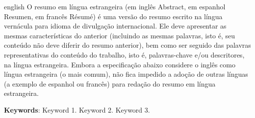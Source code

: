 \begin{resumo}[Abstract]
\begin{otherlanguage*}{english}
    O resumo em língua estrangeira (em inglês Abstract, em espanhol Resumen, em francês Résumé) é uma versão do resumo escrito na língua vernácula para idioma de divulgação internacional. Ele deve apresentar as mesmas características do anterior (incluindo as mesmas palavras, isto é, seu conteúdo não deve diferir do resumo anterior), bem como ser seguido das palavras representativas do conteúdo do trabalho, isto é, palavras-chave
    e/ou descritores, na língua estrangeira. Embora a especificação abaixo considere o inglês como língua estrangeira (o mais comum), não fica impedido a adoção de outras línguas (a exemplo de espanhol ou francês) para redação do resumo em língua estrangeira.
    \vspace{\onelineskip}
    
    \noindent 
    \textbf{Keywords}: Keyword 1. Keyword 2. Keyword 3.
 \end{otherlanguage*}
\end{resumo}